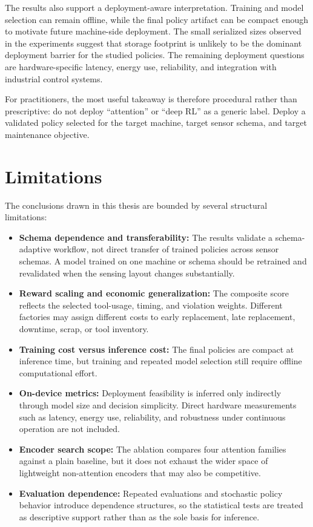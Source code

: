 \documentclass[12pt,oneside]{book}
\begin{document}
The results also support a deployment-aware interpretation. Training and model selection can remain offline, while the final policy artifact can be compact enough to motivate future machine-side deployment. The small serialized sizes observed in the experiments suggest that storage footprint is unlikely to be the dominant deployment barrier for the studied policies. The remaining deployment questions are hardware-specific latency, energy use, reliability, and integration with industrial control systems.

For practitioners, the most useful takeaway is therefore procedural rather than prescriptive: do not deploy ``attention'' or ``deep RL'' as a generic label. Deploy a validated policy selected for the target machine, target sensor schema, and target maintenance objective.

\section{Limitations}
The conclusions drawn in this thesis are bounded by several structural limitations:
\begin{itemize}
\item \textbf{Schema dependence and transferability:} The results validate a schema-adaptive workflow, not direct transfer of trained policies across sensor schemas. A model trained on one machine or schema should be retrained and revalidated when the sensing layout changes substantially.
\item \textbf{Reward scaling and economic generalization:} The composite score reflects the selected tool-usage, timing, and violation weights. Different factories may assign different costs to early replacement, late replacement, downtime, scrap, or tool inventory.
\item \textbf{Training cost versus inference cost:} The final policies are compact at inference time, but training and repeated model selection still require offline computational effort.
\item \textbf{On-device metrics:} Deployment feasibility is inferred only indirectly through model size and decision simplicity. Direct hardware measurements such as latency, energy use, reliability, and robustness under continuous operation are not included.
\item \textbf{Encoder search scope:} The ablation compares four attention families against a plain baseline, but it does not exhaust the wider space of lightweight non-attention encoders that may also be competitive.
\item \textbf{Evaluation dependence:} Repeated evaluations and stochastic policy behavior introduce dependence structures, so the statistical tests are treated as descriptive support rather than as the sole basis for inference.
\end{itemize}
\end{document}
